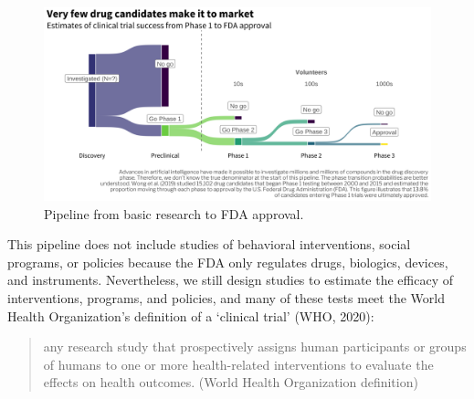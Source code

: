 \documentclass[
  letterpaper,
  DIV=11,
  numbers=noendperiod,
  oneside]{scrreprt}
\begin{document}
\begin{figure}[h]

{\centering \includegraphics{./images/figures/ctrial.png}

}

\caption{\label{fig-ctrial}Pipeline from basic research to FDA
approval.}

\end{figure}

This pipeline does not include studies of behavioral interventions,
social programs, or policies because the FDA only regulates drugs,
biologics, devices, and instruments. Nevertheless, we still design
studies to estimate the efficacy of interventions, programs, and
policies, and many of these tests meet the World Health Organization's
definition of a `clinical trial' (WHO,
2020):


\begin{quote}
any research study that prospectively assigns human participants or
groups of humans to one or more health-related interventions to evaluate
the effects on health outcomes. (World Health Organization definition)
\end{quote}
\end{document}
